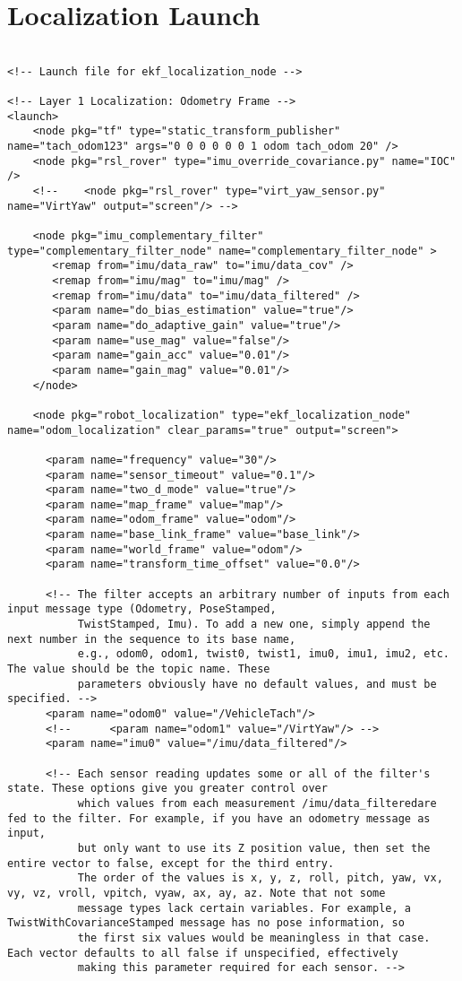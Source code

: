 \section{Localization Launch}
\begin{verbatim}

<!-- Launch file for ekf_localization_node -->

<!-- Layer 1 Localization: Odometry Frame -->
<launch>
    <node pkg="tf" type="static_transform_publisher" name="tach_odom123" args="0 0 0 0 0 0 1 odom tach_odom 20" />
    <node pkg="rsl_rover" type="imu_override_covariance.py" name="IOC" />
    <!--    <node pkg="rsl_rover" type="virt_yaw_sensor.py" name="VirtYaw" output="screen"/> -->

    <node pkg="imu_complementary_filter" type="complementary_filter_node" name="complementary_filter_node" >
	   <remap from="imu/data_raw" to="imu/data_cov" />
	   <remap from="imu/mag" to="imu/mag" />
	   <remap from="imu/data" to="imu/data_filtered" />
	   <param name="do_bias_estimation" value="true"/>
	   <param name="do_adaptive_gain" value="true"/>
	   <param name="use_mag" value="false"/>
	   <param name="gain_acc" value="0.01"/>
	   <param name="gain_mag" value="0.01"/>
    </node>

    <node pkg="robot_localization" type="ekf_localization_node" name="odom_localization" clear_params="true" output="screen">

      <param name="frequency" value="30"/>
      <param name="sensor_timeout" value="0.1"/>
      <param name="two_d_mode" value="true"/>
      <param name="map_frame" value="map"/>
      <param name="odom_frame" value="odom"/>
      <param name="base_link_frame" value="base_link"/>
      <param name="world_frame" value="odom"/>
      <param name="transform_time_offset" value="0.0"/>

      <!-- The filter accepts an arbitrary number of inputs from each input message type (Odometry, PoseStamped,
           TwistStamped, Imu). To add a new one, simply append the next number in the sequence to its base name,
           e.g., odom0, odom1, twist0, twist1, imu0, imu1, imu2, etc. The value should be the topic name. These
           parameters obviously have no default values, and must be specified. -->
      <param name="odom0" value="/VehicleTach"/>
      <!--      <param name="odom1" value="/VirtYaw"/> -->
      <param name="imu0" value="/imu/data_filtered"/>

      <!-- Each sensor reading updates some or all of the filter's state. These options give you greater control over
           which values from each measurement /imu/data_filteredare fed to the filter. For example, if you have an odometry message as input,
           but only want to use its Z position value, then set the entire vector to false, except for the third entry.
           The order of the values is x, y, z, roll, pitch, yaw, vx, vy, vz, vroll, vpitch, vyaw, ax, ay, az. Note that not some
           message types lack certain variables. For example, a TwistWithCovarianceStamped message has no pose information, so
           the first six values would be meaningless in that case. Each vector defaults to all false if unspecified, effectively
           making this parameter required for each sensor. -->


\end{verbatim}
